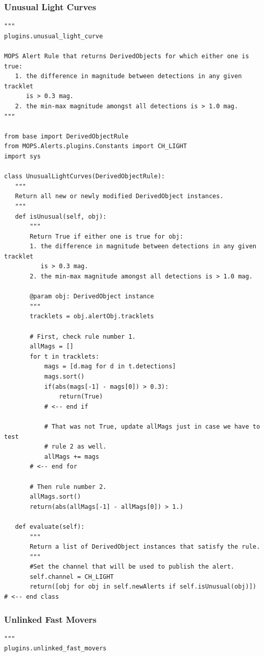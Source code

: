\documentclass[panstarrs]{panstarrs}
\begin{document}
\begin{appendices}
\subsubsection{Unusual Light Curves}
\begin{verbatim}
"""
plugins.unusual_light_curve

MOPS Alert Rule that returns DerivedObjects for which either one is true:
   1. the difference in magnitude between detections in any given tracklet
      is > 0.3 mag.
   2. the min-max magnitude amongst all detections is > 1.0 mag.
"""

from base import DerivedObjectRule
from MOPS.Alerts.plugins.Constants import CH_LIGHT
import sys

class UnusualLightCurves(DerivedObjectRule):
   """
   Return all new or newly modified DerivedObject instances.
   """
   def isUnusual(self, obj):
       """
       Return True if either one is true for obj:
       1. the difference in magnitude between detections in any given tracklet
          is > 0.3 mag.
       2. the min-max magnitude amongst all detections is > 1.0 mag.

       @param obj: DerivedObject instance
       """
       tracklets = obj.alertObj.tracklets

       # First, check rule number 1.
       allMags = []
       for t in tracklets:
           mags = [d.mag for d in t.detections]
           mags.sort()
           if(abs(mags[-1] - mags[0]) > 0.3):
               return(True)
           # <-- end if

           # That was not True, update allMags just in case we have to test
           # rule 2 as well.
           allMags += mags
       # <-- end for
       
       # Then rule number 2.
       allMags.sort()
       return(abs(allMags[-1] - allMags[0]) > 1.)
   
   def evaluate(self):
       """
       Return a list of DerivedObject instances that satisfy the rule.
       """
       #Set the channel that will be used to publish the alert.
       self.channel = CH_LIGHT
       return([obj for obj in self.newAlerts if self.isUnusual(obj)])
# <-- end class
\end{verbatim}

\subsubsection{Unlinked Fast Movers}
\begin{verbatim}
"""
plugins.unlinked_fast_movers


\end{verbatim}
\end{appendices}
\end{document}
